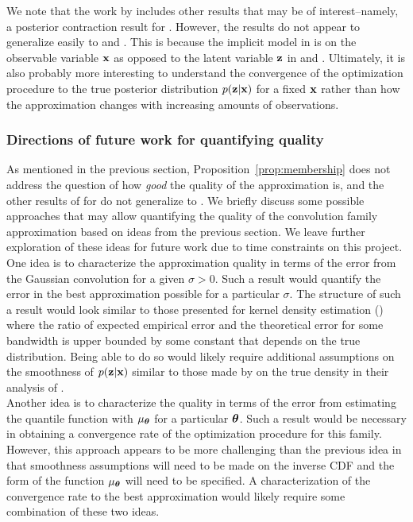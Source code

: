 \documentclass[10pt]{article}
\begin{document}
We note that the work by \citet{Plummer:2021} includes other results that may be of interest--namely, a posterior contraction result for \nllvm. However, the results do not appear to generalize easily to \sivi and \uivi. This is because the implicit model in \nllvm is on the observable variable $\mathbf{x}$ as opposed to the latent variable $\mathbf{z}$ in \sivi and \uivi. Ultimately, it is also probably more interesting to understand the convergence of the \uivi optimization procedure to the true posterior distribution $p(\mathbf{z}|\mathbf{x})$ for a fixed $\mathbf{x}$ rather than how the approximation changes with increasing amounts of observations.


\subsubsection{Directions of future work for quantifying quality}

As mentioned in the previous section, Proposition~\ref{prop:membership} does not address the question of how \textit{good} the quality of the \uivi approximation is, and the other results of \citet{Plummer:2021} for \nllvm do not generalize to \uivi. We briefly discuss some possible approaches that may allow quantifying the quality of the convolution family approximation based on ideas from the previous section. We leave further exploration of these ideas for future work due to time constraints on this project.
\\

One idea is to characterize the approximation quality in terms of the error from the Gaussian convolution for a given $\sigma>0$. Such a result would quantify the error in the best approximation possible for a particular $\sigma$. The structure of such a result would look similar to those presented for kernel density estimation (\citep[Section~9.5, Chapter~11]{Devroye:2001}) where the ratio of expected empirical error and the theoretical error for some bandwidth is upper bounded by some constant that depends on the true distribution. Being able to do so would likely require additional assumptions on the smoothness of $p(\mathbf{z}|\mathbf{x})$ similar to those made by \citet{Plummer:2021} on the true density in their analysis of \nllvm.
\\

Another idea is to characterize the quality in terms of the error from estimating the quantile function with $\mu_{\bm{\theta}}$ for a particular ${\bm{\theta}}$. Such a result would be necessary in obtaining a convergence rate of the \uivi optimization procedure for this family. However, this approach appears to be more challenging than the previous idea in that smoothness assumptions will need to be made on the inverse CDF and the form of the function $\mu_{\bm{\theta}}$ will need to be specified. \todo A characterization of the convergence rate to the best approximation would likely require some combination of these two ideas.
\end{document}
